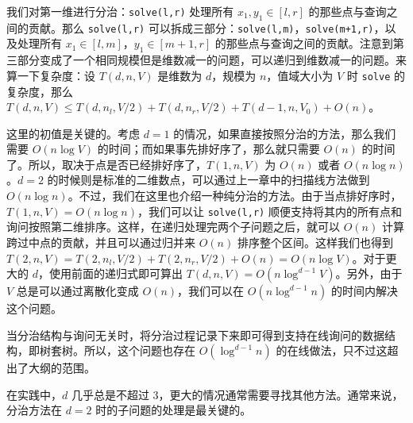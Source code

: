 我们对第一维进行分治：\texttt{solve(l,r)} 处理所有 $x_1,y_1\in[l,r]$ 的那些点与查询之间的贡献。那么 \texttt{solve(l,r)} 可以拆成三部分：\texttt{solve(l,m)}，\texttt{solve(m+1,r)}，以及处理所有 $x_1\in [l,m]$，$y_1\in [m+1,r]$ 的那些点与查询之间的贡献。注意到第三部分变成了一个相同规模但是维数减一的问题，可以递归到维数减一的问题。来算一下复杂度：设 $T(d,n,V)$ 是维数为 $d$，规模为 $n$，值域大小为 $V$ 时 \texttt{solve} 的复杂度，那么 $T(d,n,V)\le T(d,n_l,V/2)+T(d,n_r,V/2)+T(d-1,n,V_0)+O(n)$。

这里的初值是关键的。考虑 $d=1$ 的情况，如果直接按照分治的方法，那么我们需要 $O(n\log V)$ 的时间；而如果事先排好序了，那么就只需要 $O(n)$ 的时间了。所以，取决于点是否已经排好序了，$T(1,n,V)$ 为 $O(n)$ 或者 $O(n\log n)$。$d=2$ 的时候则是标准的二维数点，可以通过上一章中的扫描线方法做到 $O(n\log n)$。不过，我们在这里也介绍一种纯分治的方法。由于当点排好序时，$T(1,n,V)=O(n\log n)$，我们可以让 \texttt{solve(l,r)} 顺便支持将其内的所有点和询问按照第二维排序。这样，在递归处理完两个子问题之后，就可以 $O(n)$ 计算跨过中点的贡献，并且可以通过归并来 $O(n)$ 排序整个区间。这样我们也得到 $T(2,n,V)=T(2,n_l,V/2)+T(2,n_r,V/2)+O(n)=O(n\log V)$。对于更大的 $d$，使用前面的递归式即可算出 $T(d,n,V)=O(n\log^{d-1}V)$。另外，由于 $V$ 总是可以通过离散化变成 $O(n)$，我们可以在 $O(n\log^{d-1}n)$ 的时间内解决这个问题。

\begin{remark}
    当分治结构与询问无关时，将分治过程记录下来即可得到支持在线询问的数据结构，即树套树。所以，这个问题也存在 $O(\log^{d-1}n)$ 的在线做法，只不过这超出了大纲的范围。
\end{remark}

在实践中，$d$ 几乎总是不超过 $3$，更大的情况通常需要寻找其他方法。通常来说，分治方法在 $d=2$ 时的子问题的处理是最关键的。

